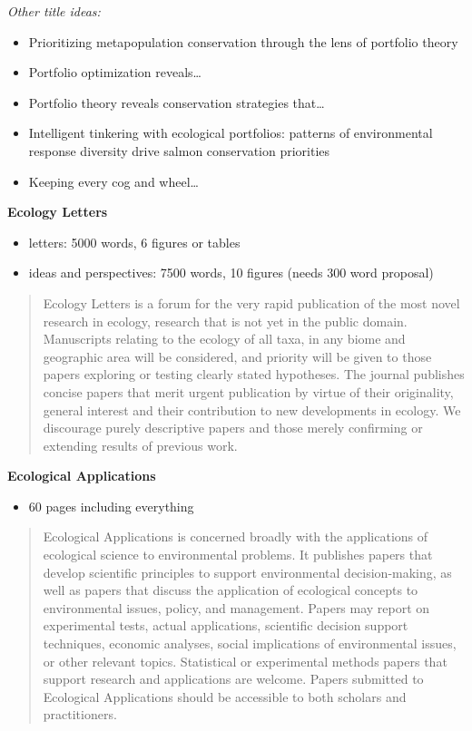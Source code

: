 \emph{Other title ideas:}

\begin{itemize}
\item
  Prioritizing metapopulation conservation through the lens of portfolio theory
\item
  Portfolio optimization reveals\ldots{}
\item
  Portfolio theory reveals conservation strategies that\ldots{}
\item
  Intelligent tinkering with ecological portfolios: patterns of environmental response diversity drive salmon conservation priorities
\item
  Keeping every cog and wheel\ldots{}
\end{itemize}

\textbf{Ecology Letters}

\begin{itemize}
\itemsep1pt\parskip0pt
\item
  letters: 5000 words, 6 figures or tables
\item
  ideas and perspectives: 7500 words, 10 figures (needs 300 word proposal)
\end{itemize}

\begin{quote}
Ecology Letters is a forum for the very rapid publication of the most novel research in ecology, research that is not yet in the public domain. Manuscripts relating to the ecology of all taxa, in any biome and geographic area will be considered, and priority will be given to those papers exploring or testing clearly stated hypotheses. The journal publishes concise papers that merit urgent publication by virtue of their originality, general interest and their contribution to new developments in ecology. We discourage purely descriptive papers and those merely confirming or extending results of previous work.
\end{quote}

\textbf{Ecological Applications}

\begin{itemize}
\itemsep1pt\parskip0pt
\item
  60 pages including everything
\end{itemize}

\begin{quote}
Ecological Applications is concerned broadly with the applications of ecological science to environmental problems. It publishes papers that develop scientific principles to support environmental decision-making, as well as papers that discuss the application of ecological concepts to environmental issues, policy, and management. Papers may report on experimental tests, actual applications, scientific decision support techniques, economic analyses, social implications of environmental issues, or other relevant topics. Statistical or experimental methods papers that support research and applications are welcome. Papers submitted to Ecological Applications should be accessible to both scholars and practitioners.
\end{quote}

